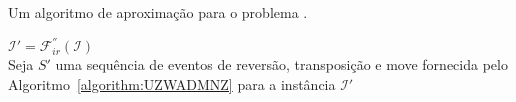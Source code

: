 \begin{algorithm}[!tbh]
  \caption{Um algoritmo de aproximação para o problema \SbFIRTM{}.\label{algorithm:JRHFSYXO}}
  $\mathcal{I}' = \mathcal{F}_{ir}^{''}(\mathcal{I})$ \\
  Seja $S'$ uma sequência de eventos de reversão, transposição e move fornecida pelo Algoritmo~\ref{algorithm:UZWADMNZ} para a instância $\mathcal{I}'$ \\
\end{algorithm}